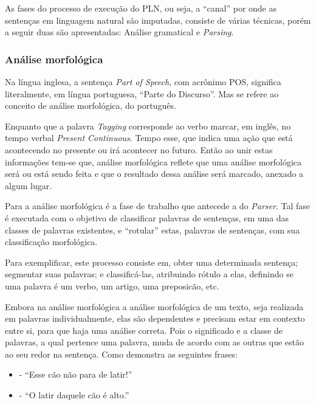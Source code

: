 As fases do processo de execução do PLN, ou seja, a “canal” por onde as sentenças em linguagem natural são imputadas, consiste de várias técnicas, porém a seguir duas são apresentadas: Análise gramatical e \textit{Parsing}.

\subsubsection{Análise morfológica}

Na língua inglesa, a sentença \textit{Part of Speech}, com acrônimo POS, significa literalmente, em língua portuguesa, “Parte do Discurso”. Mas se refere ao conceito de análise morfológica, do português.

Enquanto que a palavra \textit{Tagging} corresponde ao verbo marcar, em inglês, no tempo verbal \textit{Present Continuous}. Tempo esse, que indica uma ação que está acontecendo no presente ou irá acontecer no futuro. Então ao unir estas informações tem-se que, análise morfológica reflete que uma análise morfológica será ou está sendo feita e que o resultado dessa análise será marcado, anexado a algum lugar.

Para \cite{tecnicasPLNRanjan:16} a análise morfológica é a fase de trabalho que antecede a do \textit{Parser}. Tal fase é executada com o objetivo de classificar palavras de sentenças, em uma das classes de palavras existentes, e “rotular” estas, palavras de sentenças, com sua classificação morfológica.

Para exemplificar, este processo consiste em, obter uma determinada sentença; segmentar suas palavras; e classificá-las, atribuindo rótulo a elas, definindo se uma palavra é um verbo, um artigo, uma preposicão, etc.

Embora na análise morfológica a análise morfológica de um texto, seja realizada em palavras individualmente, elas são dependentes e precisam estar em contexto entre si, para que haja uma análise correta. Pois o significado e a classe de palavras, a qual pertence uma palavra, muda de acordo com as outras que estão ao seu redor na sentença. Como demonstra as seguintes frases: 

\begin{itemize}

\item  - “Esse cão não para de latir!”
\item  - “O latir daquele cão é alto.”

\end{itemize}

